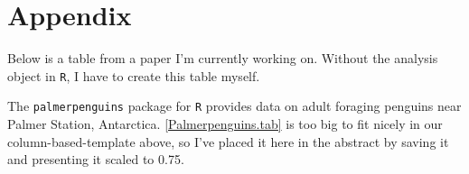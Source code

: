 \documentclass{article}\usepackage[]{graphicx}\usepackage[]{xcolor}
\begin{document}
\begin{multicols}{2}
\vspace{2em}

\begin{tiny}

\end{tiny}
\end{multicols}

\newpage
\onecolumn
\section{Appendix}
Below is a table from a paper I'm currently working on. Without the analysis object in \texttt{R}, I have to create this table myself.



The \texttt{palmerpenguins} package for \texttt{R} \citep{Palmerpenguins} provides data on adult foraging penguins near Palmer Station, Antarctica. \ref{Palmerpenguins.tab} is too big to fit nicely in our column-based-template above, so I've placed it here in the abstract by saving it and presenting it scaled to 0.75.
\end{document}
